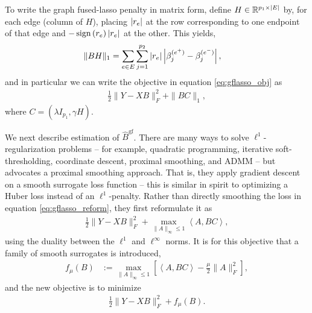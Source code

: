 \documentclass{article}
\begin{document}
To write the graph fused-lasso penalty in matrix form, define $H \in
\mathbb{R}^{p_{1} \times \left|E\right|}$ by, for each edge (column of $H$), placing
$\left|r_{e}\right|$ at the row corresponding to one endpoint of that edge and
$-\mathop\mathrm{sign}\left(r_{e}\right)\left|r_{e}\right|$ at the other. This yields,
\begin{align*}
\|BH\|_{1} &= \sum_{e \in E}\sum_{j = 1}^{p_{2}}
\left|r_{e}\right|\left|\beta_{j}^{(e^{+})} - \beta_{j}^{(e^{-})}\right|,
\end{align*}
and in particular we can write the objective in equation \ref{eq:gflasso_obj} as
\begin{align}
  \frac{1}{2}\|Y - XB\|_{F}^{2} + \|BC\|_{1}, \label{eq:gflasso_reform}
\end{align}
where $C = \left(\lambda I_{p_{1}}, \gamma H\right)$.

We next describe estimation of $\hat{B}^{\text{gf}}$. There are many ways to
solve $\ell^{1}$-regularization problems -- for example, quadratic programming,
iterative soft-thresholding, coordinate descent, proximal smoothing, and ADMM --
but \cite{chen2010graph} advocates a proximal smoothing approach. That is, they
apply gradient descent on a smooth surrogate loss function -- this is similar in
spirit to optimizing a Huber loss instead of an $\ell^{1}$-penalty. Rather than
directly smoothing the loss in equation \ref{eq:gflasso_reform}, they first
reformulate it as
\begin{align*}
  \frac{1}{2}\|Y - XB\|_{F}^{2} + \max_{\|A\|_{\infty} \leq 1}
  \left<A, BC\right>,
\end{align*}
using the duality between the $\ell^{1}$ and $\ell^{\infty}$ norms. It is
for this objective that a family of smooth surrogates is introduced,
\begin{align*}
f_{\mu}\left(B\right) &:= \max_{\|A\|_{\infty} \leq 1}
\left[\left<A, BC\right> - \frac{\mu}{2}\|A\|_{F}^{2}\right],
\end{align*}
and the new objective is to minimize
\begin{align*}
\frac{1}{2}\|Y - XB\|_{F}^{2} + f_{\mu}\left(B\right).
\end{align*}
\end{document}
